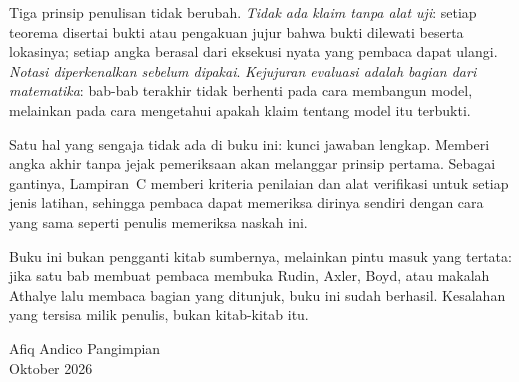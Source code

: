Tiga prinsip penulisan tidak berubah. \emph{Tidak ada klaim tanpa alat uji}: setiap
teorema disertai bukti atau pengakuan jujur bahwa bukti dilewati beserta lokasinya;
setiap angka berasal dari eksekusi nyata yang pembaca dapat ulangi. \emph{Notasi
diperkenalkan sebelum dipakai}. \emph{Kejujuran evaluasi adalah bagian dari
matematika}: bab-bab terakhir tidak berhenti pada cara membangun model, melainkan
pada cara mengetahui apakah klaim tentang model itu terbukti.

Satu hal yang sengaja tidak ada di buku ini: kunci jawaban lengkap. Memberi angka
akhir tanpa jejak pemeriksaan akan melanggar prinsip pertama. Sebagai gantinya,
Lampiran~C memberi kriteria penilaian dan alat verifikasi untuk setiap jenis latihan,
sehingga pembaca dapat memeriksa dirinya sendiri dengan cara yang sama seperti
penulis memeriksa naskah ini.

Buku ini bukan pengganti kitab sumbernya, melainkan pintu masuk yang tertata: jika
satu bab membuat pembaca membuka Rudin, Axler, Boyd, atau makalah Athalye lalu membaca
bagian yang ditunjuk, buku ini sudah berhasil. Kesalahan yang tersisa milik penulis,
bukan kitab-kitab itu.

\enlargethispage{3\baselineskip}
\vspace{0.35cm}
\begin{flushright}
Afiq Andico Pangimpian\\
Oktober 2026
\end{flushright}
